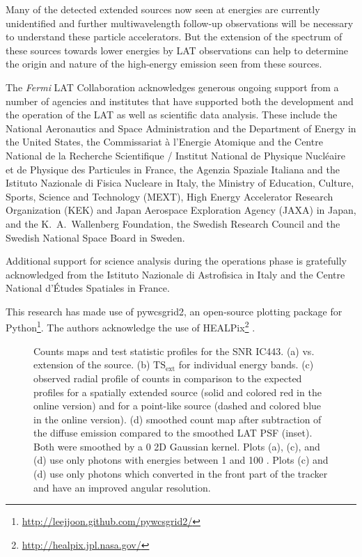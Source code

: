 \documentclass[12pt,preprint]{aastex}
\newif\ifcolorfigure
\newcommand{\gev}{\text{GeV}\xspace}
\newcommand{\tev}{\text{TeV}\xspace}
\newcommand{\tsext}{{\ensuremath{\text{TS}_{\text{ext}}}}\xspace}
\newcommand{\ts}{\text{TS}\xspace}
\begin{document}
Many of the \tev detected extended sources now seen at \gev energies are
currently unidentified and further multiwavelength follow-up observations
will be necessary to understand these particle accelerators.  But the
extension of the spectrum of these \tev sources towards lower energies
by LAT observations can help to determine the origin and nature of the
high-energy emission seen from these sources.



The \textit{Fermi} LAT Collaboration acknowledges generous ongoing support
from a number of agencies and institutes that have supported both the
development and the operation of the LAT as well as scientific data analysis.
These include the National Aeronautics and Space Administration and the
Department of Energy in the United States, the Commissariat \`a l'Energie Atomique
and the Centre National de la Recherche Scientifique / Institut National de Physique
Nucl\'eaire et de Physique des Particules in France, the Agenzia Spaziale Italiana
and the Istituto Nazionale di Fisica Nucleare in Italy, the Ministry of Education,
Culture, Sports, Science and Technology (MEXT), High Energy Accelerator Research
Organization (KEK) and Japan Aerospace Exploration Agency (JAXA) in Japan, and
the K.~A.~Wallenberg Foundation, the Swedish Research Council and the
Swedish National Space Board in Sweden.

Additional support for science analysis during the operations phase is gratefully
acknowledged from the Istituto Nazionale di Astrofisica in Italy and the Centre National d'\'Etudes Spatiales in France.

This research has made use of
pywcsgrid2, an open-source plotting package for
Python\footnote{\url{http://leejjoon.github.com/pywcsgrid2/}}. The authors acknowledge the
use of HEALPix\footnote{\url{http://healpix.jpl.nasa.gov/}} \citep{healpix}.





\clearpage
\begin{figure}
    \ifcolorfigure
    \plotone{ic443_plots/four_plots_ic443_color.eps}
    \else
    \fi
    \caption{
    Counts maps and test statistic profiles for the SNR IC443. (a) \ts
    vs. extension of the source. (b) \tsext for individual energy
    bands. (c) observed radial profile of counts in comparison to the
    expected profiles for a spatially extended source (solid and colored
    red in the online version) and for a point-like source (dashed and colored
    blue in the online version).  (d) smoothed count map after subtraction
    of the diffuse emission compared to the smoothed
    LAT PSF (inset). Both were smoothed by a 0 2D Gaussian kernel.
    Plots (a),
    (c), and (d) use only 
    photons with energies between
    1 \gev and 100 \gev.  Plots (c) and (d) use
    only photons which converted in the front part of the tracker and
    have an improved angular resolution.
    }
    \label{four_plots_ic443}
\end{figure}
\end{document}

